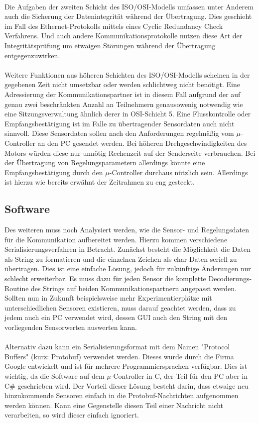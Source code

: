 \paragraph{}
Die Aufgaben der zweiten Schicht des ISO/OSI-Modells umfassen unter Anderem auch die Sicherung der Datenintegrität während der Übertragung. Dies geschieht im Fall des Ethernet-Protokolls mittels eines Cyclic Redundancy Check Verfahrens. Und auch andere Kommunikationsprotokolle nutzen diese Art der Integritätsprüfung um etwaigen Störungen während der Übertragung entgegenzuwirken.
\paragraph{}
Weitere Funktionen aus höheren Schichten des ISO/OSI-Modells scheinen in der gegebenen Zeit nicht umsetzbar oder werden schlichtweg nicht benötigt. Eine Adressierung der Kommunikationspartner ist in diesem Fall aufgrund der auf genau zwei beschränkten Anzahl an Teilnehmern genausowenig notwendig wie eine Sitzungsverwaltung ähnlich derer in OSI-Schicht 5. Eine Flusskontrolle oder Empfangsbestätigung ist im Falle zu übertragender Sensordaten auch nicht sinnvoll. Diese Sensordaten sollen nach den Anforderungen regelmäßig vom $\mu$-Controller an den PC gesendet werden. Bei höheren Drehgeschwindigkeiten des Motors würden diese nur unnötig Rechenzeit auf der Senderseite verbrauchen. Bei der Übertragung von Regelungsparametern allerdings könnte eine Empfangsbestätigung durch den $\mu$-Controller durchaus nützlich sein. Allerdings ist hierzu wie bereits erwähnt der Zeitrahmen zu eng gesteckt.
\subsection{Software}
Des weiteren muss noch Analysiert werden, wie die Sensor- und Regelungsdaten für die Kommunikation aufbereitet werden. Hierzu kommen verschiedene Serialisierungsverfahren in Betracht. Zunächst besteht die Möglichkeit die Daten als String zu formatieren und die einzelnen Zeichen als char-Daten seriell zu übertragen. Dies ist eine einfache Lösung, jedoch für zukünftige Änderungen nur schlecht erweiterbar. Es muss dazu für jeden Sensor die komplette Decodierungs-Routine des Strings auf beiden Kommunikationspartnern angepasst werden. Sollten nun in Zukunft beispielsweise mehr Experimentierplätze mit unterschiedlichen Sensoren existieren, muss darauf geachtet werden, dass zu jedem auch ein PC verwendet wird, dessen GUI auch den String mit den vorliegenden Sensorwerten auswerten kann.
\paragraph{}
Alternativ dazu kann ein Serialisierungsformat mit dem Namen "Protocol Buffers" (kurz: Protobuf)  verwendet werden. Dieses wurde durch die Firma Google entwickelt und ist für mehrere Programmiersprachen verfügbar. Dies ist wichtig, da die Software auf dem $\mu$-Controller in C, der Teil für den PC aber in C\# geschrieben wird. Der Vorteil dieser Lösung besteht darin, dass etwaige neu hinzukommende Sensoren einfach in die Protobuf-Nachrichten aufgenommen werden können. Kann eine Gegenstelle diesen Teil einer Nachricht nicht verarbeiten, so wird dieser einfach ignoriert.
